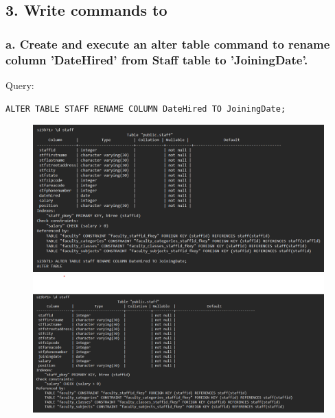 \documentclass{article}
\begin{document}
\subsection*{3. Write commands to}
\subsubsection* {a. Create and execute an alter table command to rename column 'DateHired' from Staff table to 'JoiningDate'.}
Query:
\begin{Verbatim}[frame=single,framerule=1pt,fontfamily=courier,fontsize=\small]
ALTER TABLE STAFF RENAME COLUMN DateHired TO JoiningDate;
\end{Verbatim}
\begin{figure}[H]
    \centering
    \includegraphics[width=\textwidth]{cycle1/1.3.1.png}
    \includegraphics[width=\textwidth]{cycle1/1.3.2.png}
\end{figure}
\end{document}
